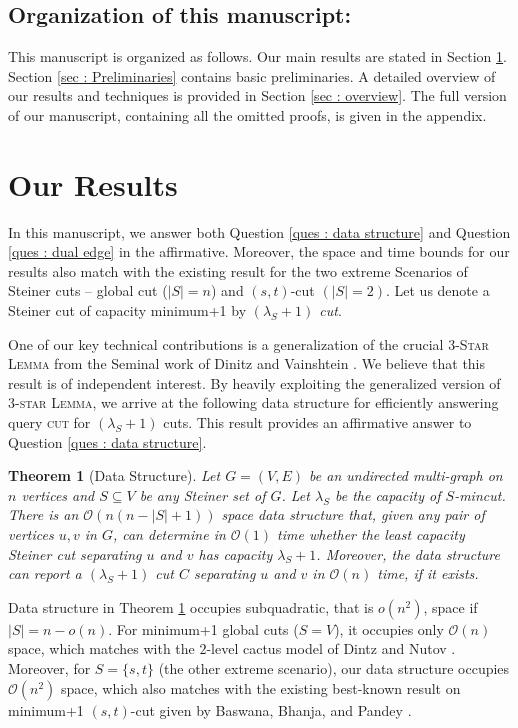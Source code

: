 \documentclass[letterpaper,11pt]{article}
\newtheorem{theorem}{Theorem}[]
\begin{document}
\subsection{Organization of this manuscript:} This manuscript is organized as follows. Our main results are stated in Section \ref{sec : our results}. Section \ref{sec : Preliminaries} contains basic preliminaries. A detailed overview of our results and techniques is provided in Section \ref{sec : overview}. The full version of our manuscript, containing all the omitted proofs, is given in the appendix. 
\section{Our Results} \label{sec : our results}
In this manuscript, we answer both Question \ref{ques : data structure} and Question \ref{ques : dual edge} in the affirmative. Moreover, the space and time bounds for our results also match with the existing result for the two extreme Scenarios of Steiner cuts -- global cut \cite{DBLP:conf/stoc/DinitzN95} ($|S|=n$) and $(s,t)$-cut \cite{DBLP:journals/talg/BaswanaBP23} $(|S|=2)$. 
Let us denote a Steiner cut of capacity minimum+1 by \textit{$(\lambda_S+1)$ cut}.

One of our key technical contributions is a generalization of the crucial \textsc{3-Star Lemma} from the Seminal work of Dinitz and Vainshtein \cite{DBLP:conf/stoc/DinitzV94, DBLP:conf/soda/DinitzV95, DBLP:journals/siamcomp/DinitzV00}. We believe that this result is of independent interest.  
By heavily exploiting the generalized version of \textsc{3-star Lemma}, we arrive at the following data structure for efficiently answering query \textsc{cut} for $(\lambda_S+1)$ cuts.
This result provides an affirmative answer to Question \ref{ques : data structure}. 

\begin{theorem}[Data Structure] \label{thm : data structure}
    Let $G=(V,E)$ be an undirected multi-graph on $n$ vertices and $S\subseteq V$ be any Steiner set of $G$. Let $\lambda_S$ be the capacity of $S$-mincut. There is an ${\mathcal O}(n(n-|S|+1))$ space data structure that, given any pair of vertices $u,v$ in $G$, can determine in ${\mathcal O}(1)$ time whether the least capacity Steiner cut separating $u$ and $v$ has capacity $\lambda_S+1$. Moreover, the data structure can report a $(\lambda_S+1)$ cut $C$ separating $u$ and $v$ in ${\mathcal O}(n)$ time, if it exists. 
\end{theorem}
Data structure in Theorem \ref{thm : data structure} occupies subquadratic, that is $o(n^2)$, space if $|S|=n-o(n)$.
For minimum+1 global cuts ($S=V$), it occupies only ${\mathcal O}(n)$ space, which matches with the $2$-level cactus model of Dintz and Nutov \cite{DBLP:conf/stoc/DinitzN95}. Moreover, for $S=\{s,t\}$ (the other extreme scenario), our data structure occupies ${\mathcal O}(n^2)$ space, which also matches with the existing best-known result on minimum+1 $(s,t)$-cut given by Baswana, Bhanja, and Pandey \cite{DBLP:journals/talg/BaswanaBP23}.  
\end{document}
